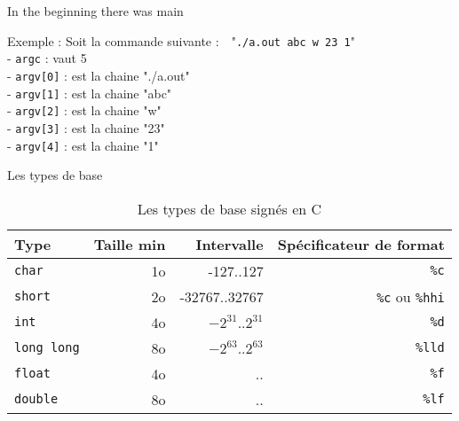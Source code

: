 \documentclass{beamer}
\begin{document}
\begin{darkframes}
  	\begin{frame}{In the beginning there was main}
	  	\begin{exampleblock}{Exemple :}
	  		Soit la commande suivante :~~"\texttt{./a.out abc w 23 1}" \\
	  		- \texttt{argc} : vaut 5 \\
	  		- \texttt{argv[0]} : est la chaine "./a.out" \\
	  		- \texttt{argv[1]} : est la chaine "abc" \\
	  		- \texttt{argv[2]} : est la chaine "w" \\
	  		- \texttt{argv[3]} : est la chaine "23" \\
	  		- \texttt{argv[4]} : est la chaine "1" \\
	  	\end{exampleblock}
  	\end{frame}
  
  	\begin{frame}{Les types de base}
  		\begin{table}[!b]
  			{\carlitoTLF %
  			\begin{tabularx}{\textwidth}{Xrrr}
  				\textbf{Type} & \textbf{Taille min} & \textbf{Intervalle} & \textbf{Spécificateur de format} \\
  				\toprule
  				\texttt{char}      & 1o  & -127..127  		   & \texttt{\%c}    				    \\
  				\texttt{short}     & 2o  & -32767..32767  	   & \texttt{\%c} ou \texttt{\%hhi}     \\
  				\texttt{int}       & 4o  & $-2^{31}$..$2^{31}$ & \texttt{\%d}    				    \\
  				\texttt{long long} & 8o  & $-2^{63}$..$2^{63}$ & \texttt{\%lld}  				    \\
  				\texttt{float}     & 4o  &    ..    		   & \texttt{\%f}    				    \\
  				\texttt{double}    & 8o  &    ..   			   & \texttt{\%lf}   					\\
  				\bottomrule
  			\end{tabularx}}
  			\caption{Les types de base signés en C}
  		\end{table}
  	\end{frame}
  

\end{darkframes}
\end{document}
